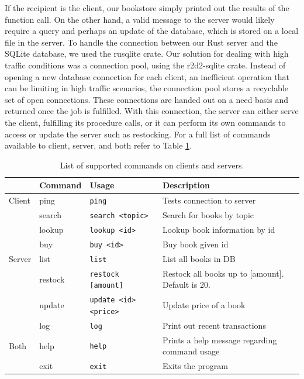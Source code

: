 \documentclass[letterpaper,11pt,twocolumn]{article}
\begin{document}
If the recipient is the client, our bookstore simply printed out the results of the function call. On the other hand, a valid message to the server would likely require a query and perhaps an update of the database, which is stored on a local file in the server. To handle the connection between our Rust server and the SQLite database, we used the rusqlite crate. Our solution for dealing with high traffic conditions was a connection pool, using the r2d2-sqlite crate. Instead of opening a new database connection for each client, an inefficient operation that can be limiting in high traffic scenarios, the connection pool stores a recyclable set of open connections. These connections are handed out on a need basis and returned once the job is fulfilled. With this connection, the server can either serve the client, fulfilling its procedure calls, or it can perform its own commands to access or update the server such as restocking. For a full list of commands available to client, server, and both refer to Table \ref{tab:commands}.

\begin{table}[bt]
\centering
 \begin{tabular}{||l l l l||} 
 \hline
  & Command & Usage & Description \\ [0.5ex] 
 \hline
 \hline
 Client & ping & \texttt{ping} & Tests connection to server \\ 
  & search & \texttt{search <topic>} & Search for books by topic \\ 
  & lookup & \texttt{lookup <id>} & Lookup book information by id \\ 
  & buy & \texttt{buy <id>} & Buy book given id \\ [0.5ex]
\hline
Server & list & \texttt{list} & List all books in DB \\
  & restock & \texttt{restock [amount]} & Restock all books up to [amount]. Default is 20. \\
  & update & \texttt{update <id> <price>} & Update price of a book \\
  & log & \texttt{log} & Print out recent transactions \\ [0.5ex]
\hline
Both  & help & \texttt{help} & Prints a help message regarding command usage \\
 & exit & \texttt{exit} & Exits the program \\ [0.5ex] 
 \hline
 \end{tabular}
 \caption{List of supported commands on clients and servers.}
 \label{tab:commands}
\end{table}
\end{document}
